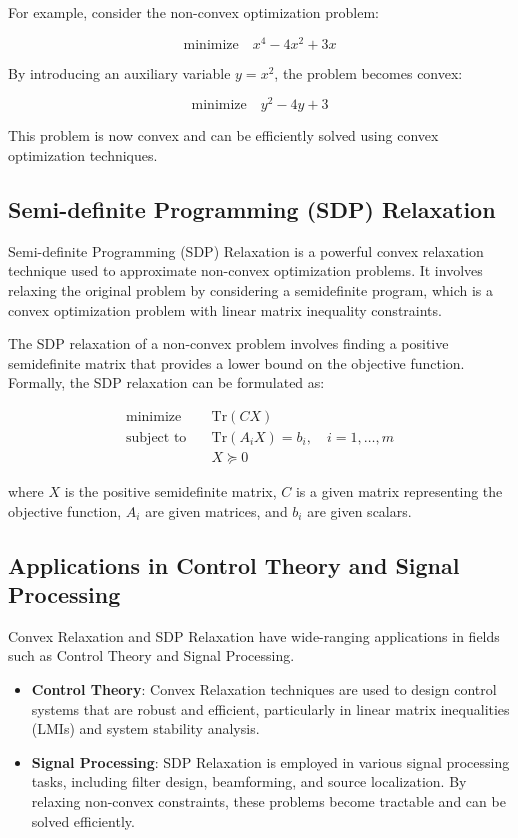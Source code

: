 \documentclass[12pt]{book} %
\begin{document}
For example, consider the non-convex optimization problem:

\[
\text{minimize} \quad x^4 - 4x^2 + 3x
\]

By introducing an auxiliary variable \(y = x^2\), the problem becomes convex:

\[
\text{minimize} \quad y^2 - 4y + 3
\]

This problem is now convex and can be efficiently solved using convex optimization techniques.

\subsection{Semi-definite Programming (SDP) Relaxation}

Semi-definite Programming (SDP) Relaxation is a powerful convex relaxation technique used to approximate non-convex optimization problems. It involves relaxing the original problem by considering a semidefinite program, which is a convex optimization problem with linear matrix inequality constraints.

The SDP relaxation of a non-convex problem involves finding a positive semidefinite matrix that provides a lower bound on the objective function. Formally, the SDP relaxation can be formulated as:

\begin{align*}
\text{minimize} \quad & \text{Tr}(CX) \\
\text{subject to} \quad & \text{Tr}(A_iX) = b_i, \quad i = 1, \ldots, m \\
& X \succeq 0
\end{align*}

where \(X\) is the positive semidefinite matrix, \(C\) is a given matrix representing the objective function, \(A_i\) are given matrices, and \(b_i\) are given scalars.

\subsection{Applications in Control Theory and Signal Processing}

Convex Relaxation and SDP Relaxation have wide-ranging applications in fields such as Control Theory and Signal Processing.

\begin{itemize}
    \item \textbf{Control Theory}: Convex Relaxation techniques are used to design control systems that are robust and efficient, particularly in linear matrix inequalities (LMIs) and system stability analysis.
    \item \textbf{Signal Processing}: SDP Relaxation is employed in various signal processing tasks, including filter design, beamforming, and source localization. By relaxing non-convex constraints, these problems become tractable and can be solved efficiently.
\end{itemize}
\end{document}
